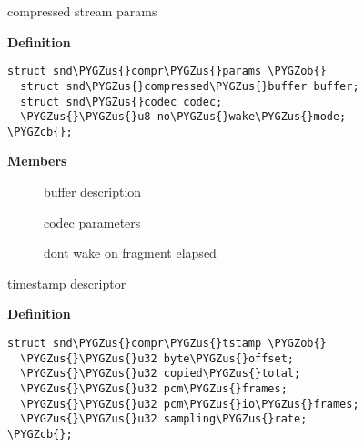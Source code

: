 \documentclass[a4paper,8pt,english]{sphinxmanual}
\def\PYGZus{\char`\_}
\def\PYGZob{\char`\{}
\def\PYGZcb{\char`\}}
\begin{document}
\begin{fulllineitems}
\label{sound/kernel-api/alsa-driver-api:c.snd_compr_params}
compressed stream params

\end{fulllineitems}


\textbf{Definition}

\begin{Verbatim}[commandchars=\\\{\}]
struct snd\PYGZus{}compr\PYGZus{}params \PYGZob{}
  struct snd\PYGZus{}compressed\PYGZus{}buffer buffer;
  struct snd\PYGZus{}codec codec;
  \PYGZus{}\PYGZus{}u8 no\PYGZus{}wake\PYGZus{}mode;
\PYGZcb{};
\end{Verbatim}

\textbf{Members}
\begin{description}
\item[{}] \leavevmode
buffer description

\item[{}] \leavevmode
codec parameters

\item[{}] \leavevmode
dont wake on fragment elapsed

\end{description}

\begin{fulllineitems}
\label{sound/kernel-api/alsa-driver-api:c.snd_compr_tstamp}
timestamp descriptor

\end{fulllineitems}


\textbf{Definition}

\begin{Verbatim}[commandchars=\\\{\}]
struct snd\PYGZus{}compr\PYGZus{}tstamp \PYGZob{}
  \PYGZus{}\PYGZus{}u32 byte\PYGZus{}offset;
  \PYGZus{}\PYGZus{}u32 copied\PYGZus{}total;
  \PYGZus{}\PYGZus{}u32 pcm\PYGZus{}frames;
  \PYGZus{}\PYGZus{}u32 pcm\PYGZus{}io\PYGZus{}frames;
  \PYGZus{}\PYGZus{}u32 sampling\PYGZus{}rate;
\PYGZcb{};
\end{Verbatim}
\end{document}

